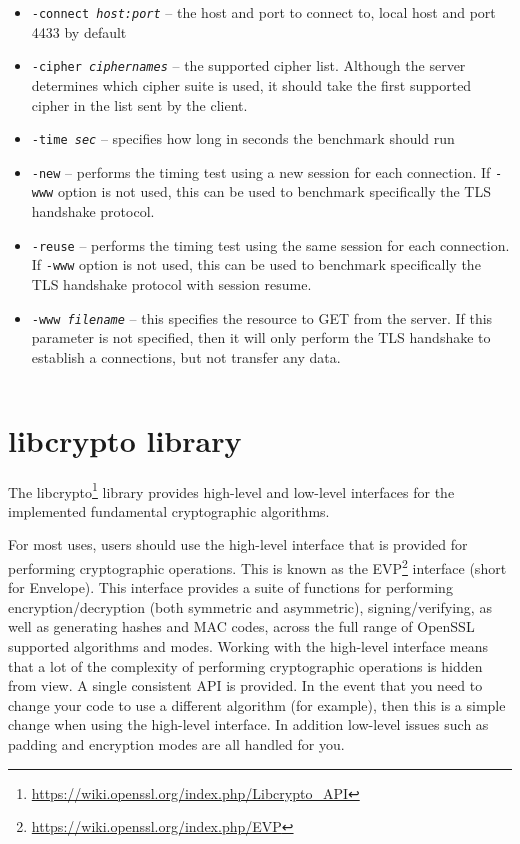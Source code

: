 \begin{itemize}
  \item \texttt{-connect \textit{host:port}} -- the host and port to connect to, local host and port 4433 by default
  \item \texttt{-cipher \textit{ciphernames}} -- the supported cipher list. Although the server determines which cipher suite is used, it should take the first supported cipher in the list sent by the client.
  \item \texttt{-time \textit{sec}} -- specifies how long in seconds the benchmark should run
  \item \texttt{-new} -- performs the timing test using a new session for each connection. If \texttt{-www} option is not used, this can be used to benchmark specifically the TLS handshake protocol.
  \item \texttt{-reuse} -- performs the timing test using the same session for each connection. If \texttt{-www} option is not used, this can be used to benchmark specifically the TLS handshake protocol with session resume.
  \item \texttt{-www \textit{filename}} -- this specifies the resource to GET from the server. If this parameter is not specified, then it will only perform the TLS handshake to establish a connections, but not transfer any data.
\end{itemize}

\inputminted{text}{code/openssl-s_time-example.txt}


\section{libcrypto library}

The libcrypto\footnote{\url{https://wiki.openssl.org/index.php/Libcrypto_API}} library provides high-level and low-level interfaces for the implemented fundamental cryptographic algorithms.

For most uses, users should use the high-level interface that is provided for performing cryptographic operations. This is known as the EVP\footnote{\url{https://wiki.openssl.org/index.php/EVP}} interface (short for Envelope). This interface provides a suite of functions for performing encryption/decryption (both symmetric and asymmetric), signing/verifying, as well as generating hashes and MAC codes, across the full range of OpenSSL supported algorithms and modes. Working with the high-level interface means that a lot of the complexity of performing cryptographic operations is hidden from view. A single consistent API is provided. In the event that you need to change your code to use a different algorithm (for example), then this is a simple change when using the high-level interface. In addition low-level issues such as padding and encryption modes are all handled for you.

